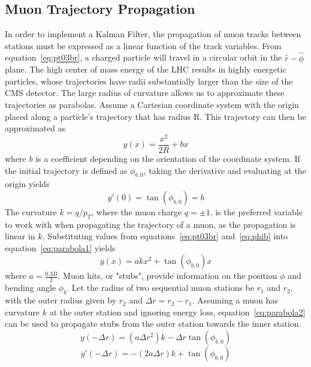 \subsection{Muon Trajectory Propagation} \label{sec:muons_prop}
In order to implement a Kalman Filter, the propagation of muon tracks between stations must be expressed as a linear function of the track variables. From equation~\ref{eq:pt03br}, a charged particle will travel in a circular orbit in the $\hat{r}-\hat{\phi}$ plane. The high center of mass energy of the LHC results in highly energetic particles, whose trajectories have radii substantially larger than the size of the CMS detector. The large radius of curvature allows us to approximate these trajectories as parabolas. Assume a Cartesian coordinate system with the origin placed along a particle's trajectory that has radius R. This trajectory can then be approximated as
\begin{equation}
	\label{eq:parabola1}
	y(x)=\frac{x^2}{2R}+bx
\end{equation}
where $b$ is a coefficient depending on the orientation of the coordinate system. If the initial trajectory is defined as $\phi_{b,0}$, taking the derivative and evaluating at the origin yields
\begin{equation}
	\label{eq:phib}
	y'(0)=\tan(\phi_{b,0})=b
\end{equation}	
The curvature $k=q/p_{T}$, where the muon charge $q=\pm1$, is the preferred variable to work with when propagating the trajectory of a muon, as the propagation is linear in $k$. Substituting values from equations~\ref{eq:pt03br} and~\ref{eq:phib} into equation~\ref{eq:parabola1} yields
\begin{equation}
	\label{eq:parabola2}
	y(x)=akx^2+\tan(\phi_{b,0})x
\end{equation}
where $a=\frac{0.3B}{2}$. Muon hits, or "stubs", provide information on the position $\phi$ and bending angle $\phi_b$. Let the radius of two sequential muon stations be $r_1$ and $r_2$, with the outer radius given by $r_2$ and $\Delta r=r_2-r_1$. Assuming a muon has curvature $k$ at the outer station and ignoring energy loss, equation~\ref{eq:parabola2} can be used to propagate stubs from the outer station towards the inner station.
\begin{equation}
	y(-\Delta r) = \left(a\Delta r^2\right)k-\Delta r\tan(\phi_{b,0})
\end{equation}
\begin{equation}
	y'(-\Delta r)=-\left(2a\Delta r\right)k+\tan(\phi_{b,0})
\end{equation}
